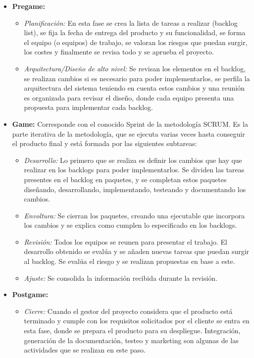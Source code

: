 \begin{itemize}
    \item \textbf{Pregame:} 
    \begin{itemize}
        \item \textit{Planificación:} En esta fase se crea la lista de tareas a realizar (backlog list), se fija la fecha de entrega del producto y su funcionalidad, se forma el equipo (o equipos) de trabajo, se valoran los riesgos que puedan surgir, los costes y finalmente se revisa todo y se aprueba el proyecto.
        \item \textit{Arquitectura/Diseño de alto nivel:} Se revisan los elementos en el backlog, se realizan cambios si es necesario para poder implementarlos, se perfila la arquitectura del sistema teniendo en cuenta estos cambios y una reunión es organizada para revisar el diseño, donde cada equipo presenta una propuesta para implementar cada backlog.
    \end{itemize}
    \item \textbf{Game:} Corresponde con el conocido Sprint de la metodología SCRUM. Es la parte iterativa de la metodología, que se ejecuta varias veces hasta conseguir el producto final y está formada por las siguientes subtareas:
    \begin{itemize}
        \item \textit{Desarrollo:} Lo primero que se realiza es definir los cambios que hay que realizar en los backlogs para poder implementarlos. Se dividen las tareas presentes en el backlog en paquetes, y se completan estos paquetes diseñando, desarrollando, implementando, testeando y documentando los cambios.
        \item \textit{Envoltura:} Se cierran los paquetes, creando una ejecutable que incorpora los cambios y se explica como cumplen lo especificado en los backlogs.
        \item \textit{Revisión:} Todos los equipos se reunen para presentar el trabajo. El desarrollo obtenido se evalúa y se añaden nuevas tareas que puedan surgir al backlog. Se evalúa el riesgo y se realizan propuestas en base a este.
        \item \textit{Ajuste:} Se consolida la información recibida durante la revisión.
    \end{itemize}
    
    \item \textbf{Postgame:}
    \begin{itemize}
        \item \textit{Cierre:} Cuando el gestor del proyecto considera que el producto está terminado y cumple con los requisitos solicitados por el cliente se entra en esta fase, donde se prepara el producto para su despliegue. Integración, generación de la documentación, testeo y marketing son algunas de las actividades que se realizan en este paso.
    \end{itemize}

\end{itemize}

